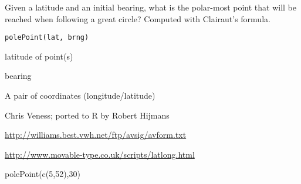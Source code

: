 \begin{Description}\relax
Given a latitude and an initial bearing, what is the polar-most point that will be reached when following a great circle? Computed with Clairaut's formula.
\end{Description}
\begin{Usage}
\begin{verbatim}
polePoint(lat, brng)
\end{verbatim}
\end{Usage}
\begin{Arguments}
\begin{ldescription}
\item[\code{lat}] latitude of point(s)
\item[\code{brng}] bearing
\end{ldescription}
\end{Arguments}
\begin{Value}
A pair of coordinates (longitude/latitude)
\end{Value}
\begin{Author}\relax
Chris Veness; ported to R by Robert Hijmans
\end{Author}
\begin{References}\relax
\url{http://williams.best.vwh.net/ftp/avsig/avform.txt}

\url{http://www.movable-type.co.uk/scripts/latlong.html}
\end{References}
\begin{Examples}
\begin{ExampleCode}
polePoint(c(5,52),30)
\end{ExampleCode}
\end{Examples}

